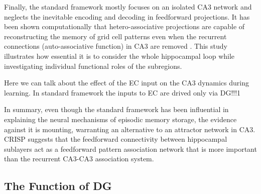 \documentclass[utf8]{frontiersSCNS} %
\begin{document}
Finally, the standard framework mostly focuses on an isolated CA3 network and neglects the inevitable encoding and decoding in feedforward projections. It has been shown computationally that hetero-associative projections are capable of reconstructing the memory of grid cell patterns even when the recurrent connections (auto-associative function) in CA3 are removed \cite{neher2015memory}. This study illustrates how essential it is to consider the whole hippocampal loop while investigating individual functional roles of the subregions. 

Here we can talk about the effect of the EC input on the CA3 dynamics during learning. In standard framework the inputs to EC are drived only via DG!!!1 




In summary, even though the standard framework has been influential in explaining the neural mechanisms of episodic memory storage, the evidence against it is mounting, warranting an alternative to an attractor network in CA3. CRISP suggests that the feedforward connectivity between hippocampal sublayers act as a feedforward pattern association network that is more important than the recurrent CA3-CA3 association system. 



\subsection{The Function of DG}
\end{document}
